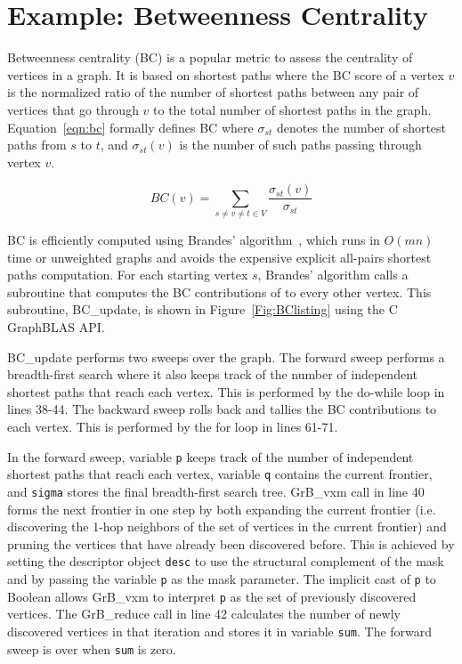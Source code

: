 \section{Example: Betweenness Centrality}

\label{sec:example}
Betweenness centrality (BC) is a popular metric to assess the centrality of vertices in a graph. It is based on shortest paths where the BC score
of a vertex $v$ is the normalized ratio of the number of shortest paths between any pair of vertices that go through $v$ to the total number of shortest paths in the graph. 
Equation~\ref{eqn:bc} formally defines BC where $\sigma_{st}$ denotes the number of shortest paths from $s$ to $t$, and $\sigma_{st}(v)$ is the number of such paths 
passing through vertex $v$.

\begin{equation}
	BC(v) = \sum_{s \neq v \neq t \in V} \frac{\sigma_{st}(v)}{\sigma_{st}}
\label{eqn:bc}
\end{equation}

BC is efficiently computed using Brandes' algorithm~\cite{brandes2001faster}, which runs in $O(mn)$ time or unweighted graphs and avoids the expensive explicit all-pairs shortest paths computation.
For each starting vertex $s$, Brandes' algorithm calls a subroutine that computes the BC contributions of to every other vertex. This subroutine, BC\_update, is
shown in Figure~\ref{Fig:BClisting} using the C GraphBLAS API. 

BC\_update performs two sweeps over the graph. The forward sweep performs a breadth-first search where it also keeps track of the number
of independent shortest paths that reach each vertex. This is performed by the do-while loop in lines 38-44. 
The backward sweep rolls back and tallies the BC contributions to each vertex. This is performed by the for loop in lines 61-71. 


\begin{figure*}[h]
\caption{C function to compute the BC-metric vector, delta, given a boolean $n \times n$ adjacency matrix $A$ and a source vertex $s $(which should be empty on input).}
\label{Fig:BClisting}
{\scriptsize

}
\end{figure*}

In the forward sweep, variable {\tt p} keeps track of the number of independent shortest paths that reach each vertex, variable {\tt q} contains the current frontier, and {\tt sigma} stores
the final breadth-first search tree. 
GrB\_vxm call in line 40 forms the next frontier in one step by both expanding the current frontier (i.e. discovering the 1-hop neighbors of the set of vertices in the current frontier) and pruning the vertices that have 
already been discovered before. This is achieved by setting the descriptor object {\tt desc} to use the structural complement of the mask and by passing the 
variable {\tt p} as the mask parameter. The implicit cast of {\tt p} to Boolean allows GrB\_vxm to interpret {\tt p} as the set of previously discovered vertices.
The GrB\_reduce call in line 42 calculates the number of newly discovered vertices in that iteration and stores it in variable {\tt sum}. The forward sweep is over when {\tt sum} is zero.